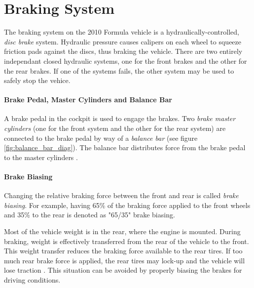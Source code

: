 \section{Braking System}
\label{sec:brake-overview}

The braking system on the 2010 Formula vehicle is a hydraulically-controlled, \emph{disc brake} system. Hydraulic pressure causes calipers on each wheel to squeeze friction pads against the discs, thus braking the vehicle. There are two entirely independant closed hydraulic systems, one for the front brakes and the other for the rear brakes. If one of the systems fails, the other system may be used to safely stop the vehice.

\paragraph{Brake Pedal, Master Cylinders and Balance Bar}

A brake pedal in the cockpit is used to engage the brakes. Two \emph{brake master cylinders} (one for the front system and the other for the rear system) are connected to the brake pedal by way of a \emph{balance bar} (see figure \ref{fig:balance_bar_diag}). The balance bar distributes force from the brake pedal to the master cylinders \cite{TiltonBrakeBias}. 

\paragraph{Brake Biasing}

Changing the relative braking force between the front and rear is called \emph{brake biasing}. For example, having 65\% of the braking force applied to the front wheels and 35\% to the rear is denoted as "65/35" brake biasing. 

Most of the vehicle weight is in the rear, where the engine is mounted. During braking, weight is effectively transferred from the rear of the vehicle to the front. This weight transfer reduces the braking force available to the rear tires. If too much rear brake force is applied, the rear tires may lock-up and the vehicle will lose traction \cite{FundVehicleDynamics}. This situation can be avoided by properly biasing the brakes for driving conditions.

